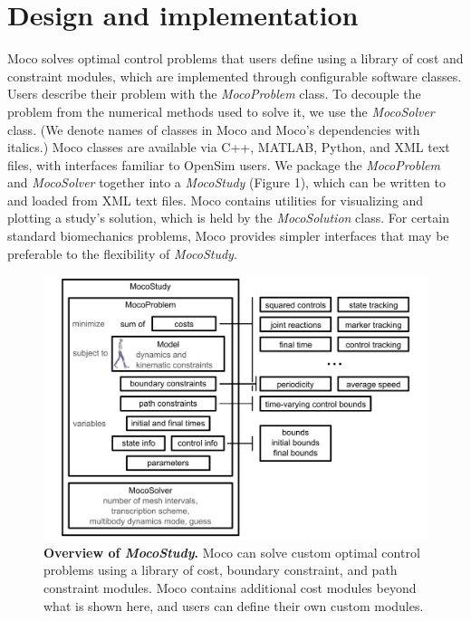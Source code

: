 \documentclass[10pt,letterpaper]{article}
\begin{document}
\section*{Design and implementation}

Moco solves optimal control problems that users define using a library of cost and constraint modules, which are implemented through configurable software classes. Users describe their problem with the \textit{MocoProblem} class. To decouple the problem from the numerical methods used to solve it, we use the \textit{MocoSolver} class. (We denote names of classes in Moco and Moco's dependencies with italics.) Moco classes are available via C++, MATLAB, Python, and XML text files, with interfaces familiar to OpenSim users. We package the \textit{MocoProblem} and \textit{MocoSolver} together into a \textit{MocoStudy} (Figure 1), which can be written to and loaded from XML text files. Moco contains utilities for visualizing and plotting a study's solution, which is held by the \textit{MocoSolution} class. For certain standard biomechanics problems, Moco provides simpler interfaces that may be preferable to the flexibility of \textit{MocoStudy}.

\begin{figure}[!h]
\centering
    \includegraphics{../figures/MocoStudyDiagram.png}
    \caption{{\bf Overview of \textit{MocoStudy}.}
    Moco can solve custom optimal control problems using a library of cost, boundary constraint, and path constraint modules. Moco contains additional cost modules beyond what is shown here, and users can define their own custom modules.}
    \label{mocodiagram}
\end{figure}
\end{document}
